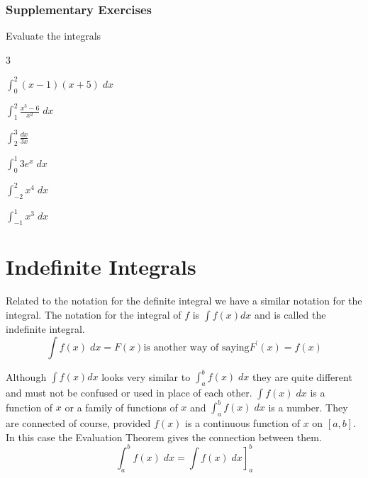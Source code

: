 \subsubsection{Supplementary Exercises}
Evaluate the integrals 
\begin{enumerate}   
\columnsep =30pt
\begin {multicols}{3}

\item $\int _{0}^{2}\left (x -1\right ) \left (x +5\right )\; d x$ 

\item $\int _{1}^{2}\frac{x^{3} -6}{x^{2}}\; d x$ 

\item $\int _{2}^{3}\frac{d x}{3 x}$ 

\item $\int _{0}^{1}3 e^{x}\; d x$ 

\item $\int _{ -2}^{2}x^{4}\; d x$ 

\item $\int _{ -1}^{1}x^{3}\; d x$ 
\end {multicols}
 \end{enumerate}


\section{Indefinite Integrals}
Related to the notation for the definite integral we have a similar notation for the integral. The
notation for the integral of $f$ is $\int f (x) d x$ and is called the indefinite integral.
\begin{equation*}\int f (x)\; d x =F (x)\text{is another way of saying}F^{ \prime } (x) =f (x)
\end{equation*}

Although $\int f (x) d x$ looks very similar to $\int _{a}^{b}f (x)\; d x$ they are quite different and must not be confused or used in place of each other. $\int f (x)\; d x$ is a function of $x$ or a family of functions of $x$ and $\int _{a}^{b}f (x)\; d x$ is a number. They are connected of course, provided $f (x)$ is a continuous function of $x$ on $\left [a ,b\right ]$. In this case the Evaluation
Theorem gives the connection between them.
\begin{equation*}\int _{a}^{b}f (x)\; d x =\left .\int f (x)\; d x\right ]_{a}^{b}
\end{equation*}


